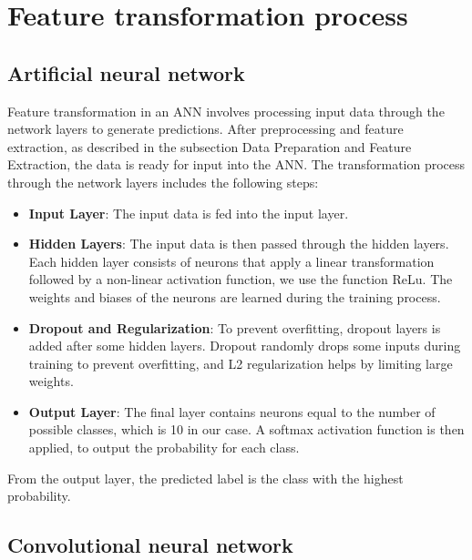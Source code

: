 \section{Feature transformation process}


\subsection{Artificial neural network}

Feature transformation in an ANN involves processing input data through the network layers to generate predictions.
After preprocessing and feature extraction, as described in the subsection Data Preparation and Feature Extraction, the data is ready for input into the ANN. 
The transformation process through the network layers includes the following steps:
\begin{itemize}
    \item \textbf{Input Layer}: The input data is fed into the input layer.
    \item \textbf{Hidden Layers}: The input data is then passed through the hidden layers. Each hidden layer consists of neurons that apply a linear transformation followed by a non-linear activation function, we use the function ReLu. The weights and biases of the neurons are learned during the training process.
    \item \textbf{Dropout and Regularization}: To prevent overfitting, dropout layers is added after some hidden layers. Dropout randomly drops some inputs during training to prevent overfitting, and L2 regularization helps by limiting large weights.
    \item \textbf{Output Layer}: The final layer contains neurons equal to the number of possible classes, which is 10 in our case. A softmax activation function is then applied, to output the probability for each class.
\end{itemize}
From the output layer, the predicted label is the class with the highest probability.

\subsection{Convolutional neural network}

